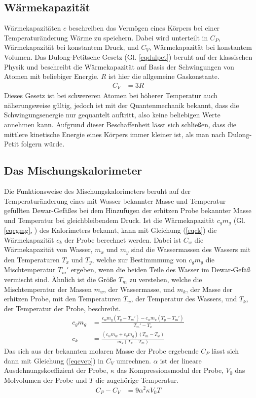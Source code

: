 \subsection{Wärmekapazität}
Wärmekapazitäten $c$ beschreiben das Vermögen eines Körpers bei einer Temperaturänderung
Wärme zu speichern. Dabei wird unterteilt in $C_P$, Wärmekapazität bei konstantem Druck, und 
$C_V$, Wärmekapazität bei konstantem Volumen. Das Dulong-Petitsche Gesetz \cite{anleitung} 
(Gl. \ref{eqdulpet}) beruht auf der klassischen Physik und beschreibt die Wärmekapazität auf 
Basis der Schwingungen von Atomen mit beliebiger Energie. $R$ ist hier die allgemeine Gaskonstante.
\begin{align}
C_V&=3 R \label{eqdulpet}
\end{align}
Dieses Gesetz ist bei schwereren Atomen bei höherer Temperatur auch näherungsweise gültig, jedoch
ist mit der Quantenmechanik bekannt, dass die Schwingungsenergie nur gequantelt auftritt, also 
keine beliebigen Werte annehmen kann. Aufgrund dieser Beschaffenheit lässt sich schließen, dass
die mittlere kinetische Energie eines Körpers immer kleiner ist, als man nach Dulong-Petit folgern 
würde.\\
\subsection{Das Mischungskalorimeter}
Die Funktionsweise des Mischungskalorimeters beruht auf der Temperaturänderung eines mit Wasser 
bekannter Masse und Temperatur gefüllten Dewar-Gefäßes bei dem Hinzufügen der erhitzen Probe 
bekannter Masse und Temperatur bei gleichbleibendem Druck. Ist die Wärmekapazität $c_g m_g$ 
(Gl. \ref{eqcgmg},\cite{anleitung} ) des Kalorimeters bekannt, kann mit Gleichung  (\ref{eqck}) \cite{anleitung}
die Wärmekapazität $c_k$ der Probe berechnet werden. Dabei ist $C_w$ die Wärmekapazität von Wasser, 
$m_x$ und $m_y$ sind die Wassermassen des Wassers mit den Temperaturen $T_x$ und $T_y$, welche zur 
Bestimmmung von $c_gm_g$ die Mischtemperatur $T_m'$ ergeben, wenn die beiden Teile des Wasser im 
Dewar-Gefäß vermischt sind. Ähnlich ist die Größe $T_m$ zu verstehen, welche die Mischtemperatur 
der Massen $m_w$, der Wassermasse, und $m_k$, der Masse der erhitzen Probe, mit den Temperaturen $T_w$,
 der Temperatur des Wassers, und $T_k$, der Temperatur der Probe, beschreibt.
\begin{align}
c_gm_g&=\frac{c_w m_y (T_y - T_m')-c_w m_x(T_y-T_m')}{T_m'-T_x} \label{eqcgmg} \\
c_k&=\frac{(c_w m_w + c_g m_g)(T_m-T_w)}{m_k(T_k - T_m)} \label{eqck}
\end{align}
Das sich aus der bekannten molaren Masse der Probe ergebende $C_P$ lässt sich dann mit
Gleichung  (\ref{eqcvcp}) \cite{anleitung}  in $C_V$ umrechnen. $\alpha$ ist der lineare 
Ausdehnungskoeffizient der Probe, $\kappa$ das Kompressionsmodul der Probe, $V_0$ das Molvolumen
der Probe und $T$ die zugehörige Temperatur.
\begin{align}
C_P-C_V&=9 \alpha^2 \kappa V_0 T \label{eqcvcp}
\end{align}
